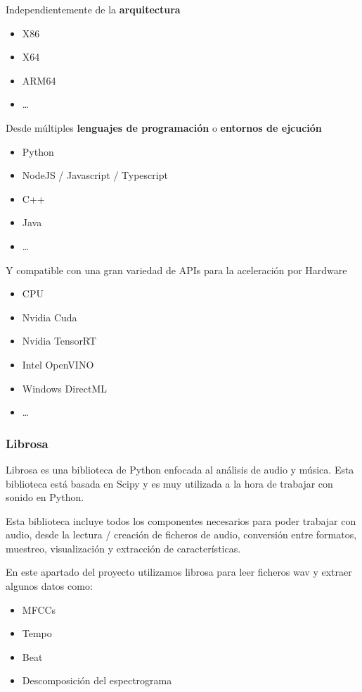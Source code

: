 Independientemente de la \textbf{arquitectura}

\begin{itemize}
\itemsep0em 
\item
  X86
\item
  X64
\item
  ARM64
\item
  \ldots{}
\end{itemize}

Desde múltiples \textbf{lenguajes de programación} o \textbf{entornos de
ejcución}

\begin{itemize}
\itemsep0em 
\item
  Python
\item
  NodeJS / Javascript / Typescript
\item
  C++
\item
  Java
\item
  \ldots{}
\end{itemize}

Y compatible con una gran variedad de APIs para la aceleración por
Hardware

\begin{itemize}
\itemsep0em 
\item
  CPU
\item
  Nvidia Cuda
\item
  Nvidia TensorRT
\item
  Intel OpenVINO
\item
  Windows DirectML
\item
  \ldots{}
\end{itemize}

\hypertarget{librosa}{%
\subsubsection{Librosa}\label{librosa}}

Librosa es una biblioteca de Python enfocada al análisis de audio y
música. Esta biblioteca está basada en Scipy y es muy utilizada a la
hora de trabajar con sonido en Python.

Esta biblioteca incluye todos los componentes necesarios para poder
trabajar con audio, desde la lectura / creación de ficheros de audio,
conversión entre formatos, muestreo, visualización y extracción de
características.

En este apartado del proyecto utilizamos librosa para leer ficheros wav
y extraer algunos datos como:

\begin{itemize}
\itemsep0em 
\item
  MFCCs
\item
  Tempo
\item
  Beat
\item
  Descomposición del espectrograma
\end{itemize}

